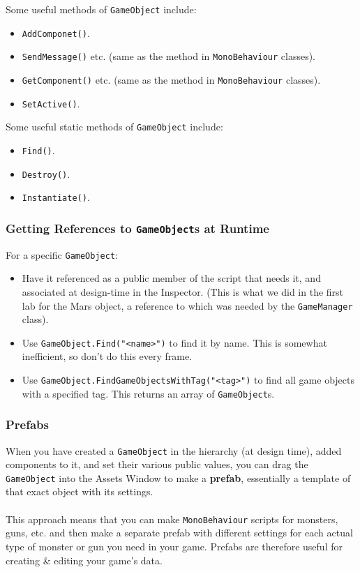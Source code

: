 \documentclass[a4paper,11pt]{article}
\begin{document}
Some useful methods of \verb|GameObject| include:
\begin{itemize}
    \item   \verb|AddComponet()|. 
    \item   \verb|SendMessage()| etc. (same as the method in \verb|MonoBehaviour| classes).
    \item   \verb|GetComponent()| etc. (same as the method in \verb|MonoBehaviour| classes).
    \item   \verb|SetActive()|.  
\end{itemize}

Some useful static methods of \verb|GameObject| include:
\begin{itemize}
    \item   \verb|Find()|. 
    \item   \verb|Destroy()|. 
    \item   \verb|Instantiate()|. 
\end{itemize}

\subsubsection{Getting References to \texttt{GameObject}s at Runtime}
For a specific \verb|GameObject|:
\begin{itemize}
    \item   Have it referenced as a public member of the script that needs it, and associated at design-time in the Inspector.
            (This is what we did in the first lab for the Mars object, a reference to which was needed by the
            \verb|GameManager| class).
    \item   Use \verb|GameObject.Find("<name>")| to find it by name. This is somewhat inefficient, so don't do this every frame. 
    \item   Use \verb|GameObject.FindGameObjectsWithTag("<tag>")| to find all game objects with a specified tag. This returns an array
            of \verb|GameObject|s.
\end{itemize}

\subsubsection{Prefabs}
When you have created a \verb|GameObject| in the hierarchy (at design time), added components to it, and set their various 
public values, you can drag the \verb|GameObject| into the Assets Window to make a \textbf{prefab}, essentially a template of 
that exact object with its settings. 
\\\\
This approach means that you can make \verb|MonoBehaviour| scripts for monsters, guns, etc. and then make a separate prefab 
with different settings for each actual type of monster or gun you need in your game.
Prefabs are therefore useful for creating \& editing your game's data. 
 
\end{document}
